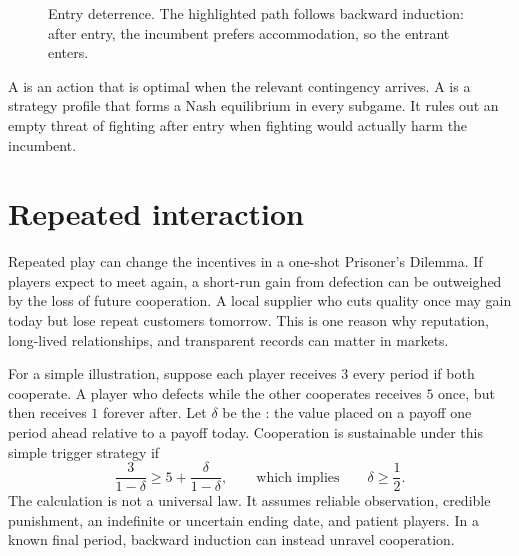 \begin{figure}[htbp]
  \centering
  \caption{Entry deterrence. The highlighted path follows backward induction:
  after entry, the incumbent prefers accommodation, so the entrant enters.}
  \label{fig:entry-deterrence}
\end{figure}
\FloatBarrier

A  is an action that is optimal when the relevant
contingency arrives. A  is a strategy
profile that forms a Nash equilibrium in every subgame. It rules out an empty
threat of fighting after entry when fighting would actually harm the incumbent.

\section{Repeated interaction}

Repeated play can change the incentives in a one-shot Prisoner's Dilemma. If
players expect to meet again, a short-run gain from defection can be outweighed
by the loss of future cooperation. A local supplier who cuts quality once may
gain today but lose repeat customers tomorrow. This is one reason why
reputation, long-lived relationships, and transparent records can matter in
markets.

For a simple illustration, suppose each player receives \(3\) every period if
both cooperate. A player who defects while the other cooperates receives \(5\)
once, but then receives \(1\) forever after. Let \(\delta\) be the
: the value placed on a payoff one period ahead
relative to a payoff today. Cooperation is sustainable under this simple
trigger strategy if
\[
\frac{3}{1-\delta}\geq 5+\frac{\delta}{1-\delta},
\qquad\text{which implies}\qquad
\delta\geq \frac{1}{2}.
\]
The calculation is not a universal law. It assumes reliable observation,
credible punishment, an indefinite or uncertain ending date, and patient
players. In a known final period, backward induction can instead unravel
cooperation.

